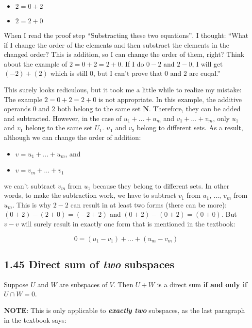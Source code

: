 \documentclass[12pt, letterpaper, oneside]{book}
\begin{document}
\begin{itemize}
  \item $2 = 0 + 2$
  \item $2 = 2 + 0$
\end{itemize}

When I read the proof step ``Substracting these two equations'', I thought:
``What if I change the order of the elements and then substract the elements in
the changed order? This is addition, so I can change the order of them, right?
Think about the example of $2 = 0 + 2 = 2 + 0$. If I do $0 - 2$ and $2 - 0$, I
will get $(-2) + (2)$ which is still $0$, but I can't prove that $0$ and $2$
are euqal.''

This surely looks rediculous, but it took me a little while to realize my
mistake: The example $2 = 0 + 2 = 2 + 0$ is not appropriate. In this example,
the additive operands $0$ and $2$ both belong to the same set $\mathbf{N}$.
Therefore, they can be added and subtracted. However, in the case of $u_1 +
\ldots + u_m$ and $v_1 + \ldots + v_m$, only $u_1$ and $v_1$ belong to the same
set $U_1$. $u_1$ and $v_2$ belong to different sets. As a result, although we
can change the order of addition:

\begin{itemize}
  \item $v = u_1 + \ldots + u_m$, and
  \item $v = v_m + \ldots + v_1$
\end{itemize}

we can't subtract $v_m$ from $u_1$ because they belong to different sets. In
other words, to make the subtraction work, we have to subtract $v_1$ from $u_1$,
$\ldots$, $v_m$ from $u_m$. This is why $2 - 2$ can result in at least two
forms (there can be more): $(0 + 2) - (2 + 0) = (-2 + 2)$ and $(0 + 2) -
(0 + 2) = (0 + 0)$. But $v - v$ will surely result in exactly one form that is
mentioned in the textbook:

\[
  0 = (u_1 - v_1) + \ldots + (u_m - v_m)
\]

\subsection{1.45 Direct sum of \textbf{\textit{two}} subspaces}

Suppose $U$ and $W$ are subspaces of $V$. Then $U + W$ is a direct sum
\textbf{if and only if} $U \cap W = {0}$.

\textbf{NOTE}: This is only applicable to \textbf{\textit{exactly two}}
subspaces, as the last paragraph in the textbook says:
\end{document}
